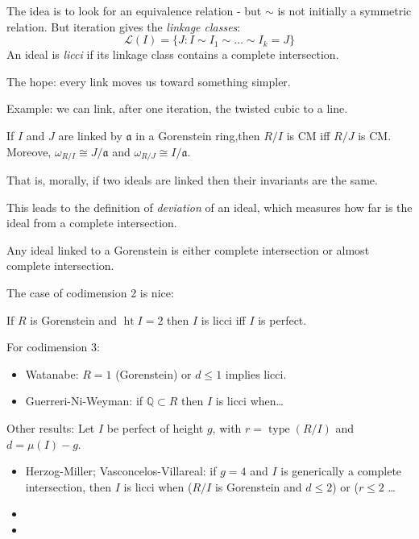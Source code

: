 The idea is to look for an equivalence
relation - but $\sim$ is not initially a
symmetric relation. But iteration
gives the {\it linkage classes}:
$$
\mathcal{L}(I)=\{J:I \sim I_1 \sim…
\sim I_k=J\}
$$
An ideal is {\it licci} if its
linkage class contains a complete
intersection.

The hope: every link moves us toward
something simpler.

Example: we can link, after one iteration,
the twisted cubic to a line.

\begin{theorem}
\label{theorem-ps}
If $I$ and $J$ are linked by $\mathfrak{a}$
in a Gorenstein ring,then
$R/I$ is CM iff $R/J$ is CM.
Moreove, $\omega_{R/I} \cong J/\mathfrak{a}$
and $\omega_{R/J} \cong I/\mathfrak{a}$.
\end{theorem}

\noindent
That is, morally, if two ideals are
linked then their invariants are the same.

This leads to the definition of
{\it deviation} of an ideal, which measures
how far is the ideal from a complete
intersection.

Any ideal linked to a Gorenstein is either
complete intersection or almost complete
intersection.

\medskip\noindent
The case of codimension 2 is nice:

\begin{theorem}
\label{theorem-agps}
If $R$ is Gorenstein and
$\operatorname{ht}I=2$ then $I$ is licci iff
$I$ is perfect.
\end{theorem}

\noindent
For codimension 3:

\begin{itemize}
\item Watanabe: $R=1$ (Gorenstein) or
$d \leq 1$ implies licci.

\item Guerreri-Ni-Weyman: if $\mathbb{Q}
\subset R$ then $I$ is licci when…
\end{itemize}

\noindent
Other results: Let $I$ be perfect
of height $g$, with
$r=\operatorname{type}(R/I)$ and 
$d = \mu(I) -g$.
\begin{itemize}
\item Herzog-Miller; Vasconcelos-Villareal:
if $g = 4$ and $I$ is generically a complete
intersection, then $I$ is licci when ($R/I$
is Gorenstein and $d \leq 2$) or
($r \leq 2$ …

\item 

\item 
\end{itemize}

